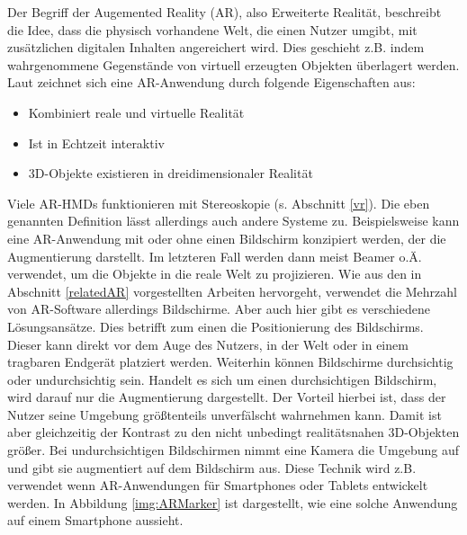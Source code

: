 Der Begriff der Augemented Reality (AR), also Erweiterte Realität, beschreibt die Idee, dass die physisch vorhandene Welt, die einen Nutzer umgibt, mit zusätzlichen digitalen Inhalten angereichert wird. Dies geschieht z.B. indem wahrgenommene Gegenstände von virtuell erzeugten Objekten überlagert werden. 
Laut \cite{azuma97} zeichnet sich eine AR-Anwendung durch folgende Eigenschaften aus:

\begin{itemize}
\item Kombiniert reale und virtuelle Realität
\item Ist in Echtzeit interaktiv
\item 3D-Objekte existieren in dreidimensionaler Realität
\end{itemize}

Viele AR-HMDs funktionieren mit Stereoskopie (s. Abschnitt \ref{vr}). Die eben genannten Definition lässt allerdings auch andere Systeme zu. 
Beispielsweise kann eine AR-Anwendung mit oder ohne einen Bildschirm konzipiert werden, der die Augmentierung darstellt. Im letzteren Fall werden dann meist Beamer o.Ä. verwendet, um die Objekte in die reale Welt zu projizieren. 
Wie aus den in Abschnitt \ref{relatedAR} vorgestellten Arbeiten hervorgeht, verwendet die Mehrzahl von AR-Software allerdings Bildschirme. 
Aber auch hier gibt es verschiedene Lösungsansätze. Dies betrifft zum einen die Positionierung des Bildschirms. Dieser kann direkt vor dem Auge des Nutzers, in der Welt oder in einem tragbaren Endgerät platziert werden.
Weiterhin können Bildschirme durchsichtig oder undurchsichtig sein. Handelt es sich um einen durchsichtigen Bildschirm, wird darauf nur die Augmentierung dargestellt. Der Vorteil hierbei ist, dass der Nutzer seine Umgebung größtenteils unverfälscht wahrnehmen kann. Damit ist aber gleichzeitig der Kontrast zu den nicht unbedingt realitätsnahen 3D-Objekten größer.
Bei undurchsichtigen Bildschirmen nimmt eine Kamera die Umgebung auf und gibt sie augmentiert auf dem Bildschirm aus. Diese Technik wird z.B. verwendet wenn AR-Anwendungen für Smartphones oder Tablets entwickelt werden. In Abbildung \ref{img:ARMarker} ist dargestellt, wie eine solche Anwendung auf einem Smartphone aussieht.

